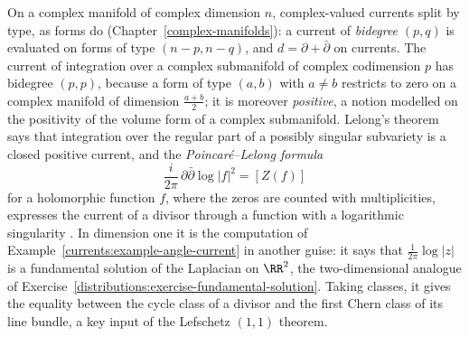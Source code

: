 \begin{remark}\label{currents:remark-complex-currents}
On a complex manifold of complex dimension $n$, complex-valued currents split by type, as forms do (Chapter~\ref{complex-manifolds}): a current of \emph{bidegree} $(p, q)$ is evaluated on forms of type
$(n - p, n - q)$, and $d = \partial + \bar\partial$ on currents. The current of integration over a complex submanifold of complex codimension $p$ has bidegree $(p, p)$, because a form of type
$(a, b)$ with $a \neq b$ restricts to zero on a complex manifold of dimension $\frac{a+b}{2}$; it is moreover \emph{positive}, a notion modelled on the positivity of the volume form of a complex
submanifold. Lelong's theorem says that integration over the regular part of a possibly singular subvariety is a closed positive current, and the \emph{Poincar\'e--Lelong formula}
\[
\frac{i}{2\pi}\,\partial\bar\partial\log|f|^2 = [Z(f)]
\]
for a holomorphic function $f$, where the zeros are counted with multiplicities, expresses the current of a divisor through a function with a logarithmic singularity
\cite[Chapter 3]{griffiths-harris}. In dimension one it is the computation of Example~\ref{currents:example-angle-current} in another guise: it says that $\frac{1}{2\pi}\log|z|$ is a fundamental solution of the Laplacian
on $\RR^2$, the two-dimensional analogue of Exercise~\ref{distributions:exercise-fundamental-solution}. Taking classes, it gives the equality between the cycle class of a divisor and the first Chern class of its line bundle, a key
input of the Lefschetz $(1,1)$ theorem.
\end{remark}

